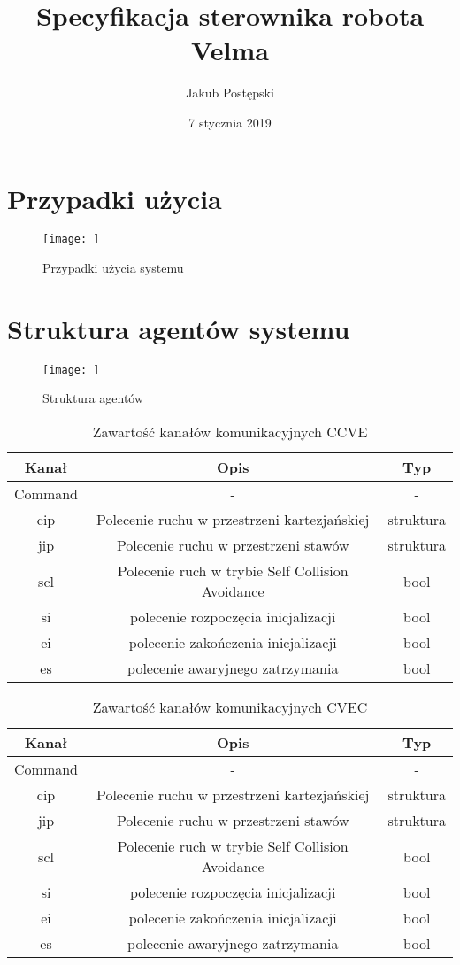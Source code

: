 \documentclass[]{article}
\title{Specyfikacja sterownika robota Velma}
\author{Jakub Postępski}
\date{7 stycznia 2019}
\begin{document}
\maketitle

\section{Przypadki użycia}

\begin{figure}[H]
	\centering
	\texttt{[image: ]}
	\caption{Przypadki użycia systemu}
	\label{fig:uc}
\end{figure}

\section{Struktura agentów systemu}

\begin{figure}[H]
	\centering
	\texttt{[image: ]}
	\caption{Struktura agentów}
	\label{fig:agents}
\end{figure}


\begin{table}[H]
	\begin{tabular}{||c|cc||}
		\hline
		Kanał & Opis & Typ \\
		\hline\hline
		Command & - & - \\
		cip & Polecenie ruchu w przestrzeni kartezjańskiej & struktura \\
  		jip & Polecenie ruchu w przestrzeni stawów & struktura \\
  		scl & Polecenie ruch w trybie Self Collision Avoidance & bool \\
		si & polecenie rozpoczęcia inicjalizacji & bool \\
		ei & polecenie zakończenia inicjalizacji & bool \\
		es & polecenie awaryjnego zatrzymania & bool \\
		\hline
	\end{tabular}
	\caption{Zawartość kanałów komunikacyjnych CCVE}
\end{table}

\begin{table}[H]
	\begin{tabular}{||c|cc||}
		\hline
		Kanał & Opis & Typ \\
		\hline\hline
		Command & - & - \\
		cip & Polecenie ruchu w przestrzeni kartezjańskiej & struktura \\
		jip & Polecenie ruchu w przestrzeni stawów & struktura \\
		scl & Polecenie ruch w trybie Self Collision Avoidance & bool \\
		si & polecenie rozpoczęcia inicjalizacji & bool \\
		ei & polecenie zakończenia inicjalizacji & bool \\
		es & polecenie awaryjnego zatrzymania & bool \\
		\hline
	\end{tabular}
	\caption{Zawartość kanałów komunikacyjnych CVEC}
\end{table}
\end{document}
